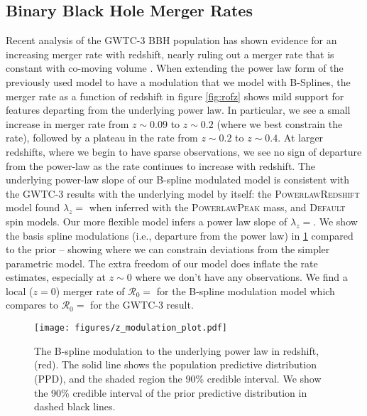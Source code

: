\subsection{Binary Black Hole Merger Rates} \label{sec:redshift}

Recent analysis of the GWTC-3 BBH population has shown evidence for an increasing merger rate with redshift, nearly ruling out a merger rate that is 
constant with co-moving volume \citep{Fishbach_2018redshift,o3b_astro_dist}. When extending the power law form of the previously used model to have a modulation 
that we model with B-Splines, the merger rate as a function of redshift in figure \ref{fig:rofz} shows mild support for features departing from the underlying power law. 
In particular, we see a small increase in merger rate from $z\sim0.09$ to $z\sim0.2$ (where we best constrain the rate), followed by a plateau in the rate from $z\sim0.2$ to $z\sim0.4$. 
At larger redshifts, where we begin to have sparse observations, we see no sign of departure from the power-law as the rate continues to increase with redshift. 
The underlying power-law slope of our B-spline modulated model is consistent with the GWTC-3 results with the underlying model by itself: the \textsc{PowerlawRedshift} model 
found $\lambda_z = $\result{$\CIPlusMinus{\macros[PLPeak][lamb]}$} when inferred with the \textsc{PowerlawPeak} mass, and \textsc{Default} spin models. Our more 
flexible model infers a power law slope of $\lambda_z = $\result{$\CIPlusMinus{\macros[BSplineIIDCompSpins][lamb]}$}. We show the basis spline modulations (i.e., departure 
from the power law) in \ref{fig:z_modulation} compared to the prior -- showing where we can constrain deviations from the simpler parametric model. 
The extra freedom of our model does inflate the rate estimates, especially at $z\sim0$ where we don't have any observations. We find a local ($z=0$) merger rate 
of $\mathcal{R}_0 = $ for the B-spline modulation model which compares to 
$\mathcal{R}_0 = $ for the GWTC-3 result. 

\begin{figure}[h]
    \texttt{[image: figures/z\_modulation\_plot.pdf]}
    \caption{The B-spline modulation to the underlying power law in redshift, (red). The solid line shows the population predictive distribution (PPD),
    and the shaded region the 90\% credible interval. We show the 90\% credible interval of the prior predictive distribution in dashed black lines.}
    \label{fig:z_modulation}
\end{figure}
